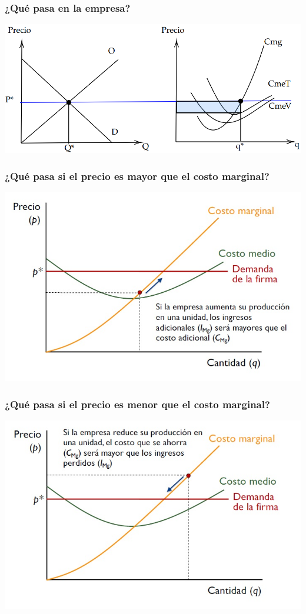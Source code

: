\documentclass{beamer}
\begin{document}
\begin{frame}
    \frametitle{¿Qué pasa en la empresa?}
    \includegraphics[scale=0.55]{../Figures/C21.5.png}
\end{frame}

\begin{frame}
\frametitle{¿Qué pasa si el precio es mayor que el costo marginal?}
\includegraphics[scale=0.55]{../Figures/Tema_07.8_compperfecta2.jpg}
\end{frame}

\begin{frame}
\frametitle{¿Qué pasa si el precio es menor que el costo marginal?}
\includegraphics[scale=0.55]{../Figures/Tema_07.9_compperfecta3.jpg}
\end{frame}
\end{document}
